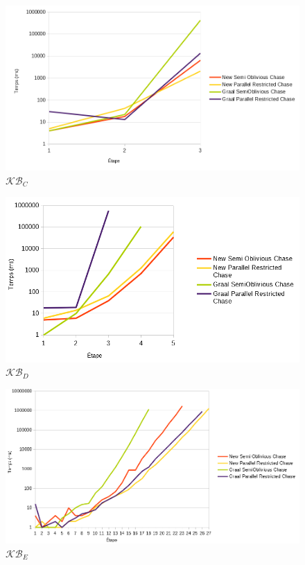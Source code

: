 \begin{figure}
\centering
\includegraphics[width=\textwidth]{pictures/benchmark_old-new/ex2oldnew.png}
\caption{$\mathcal{KB}_C$}
\label{fig:ex2oldnew}
\end{figure}

\begin{figure}
\centering
\includegraphics[width=\textwidth]{pictures/benchmark_old-new/ex11oldnew.png}
\caption{$\mathcal{KB}_D$}
\label{fig:ex11oldnew}
\end{figure}

\begin{figure}
\centering
\includegraphics[width=\textwidth]{pictures/benchmark_old-new/exampleoldnew.png}
\caption{$\mathcal{KB}_E$}
\label{fig:exampleoldnew}
\end{figure}

